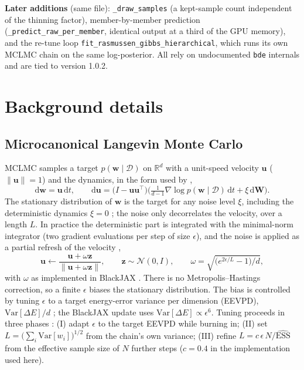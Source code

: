 \documentclass[11pt]{article}
\newcommand{\code}[1]{\texttt{#1}}
\begin{document}
\textbf{Later additions} (same file): \code{\_draw\_samples} (a kept-sample count independent of the thinning
factor), member-by-member prediction (\code{\_predict\_raw\_per\_member}, identical output at a third of the GPU
memory), and the re-tune loop \code{fit\_rasmussen\_gibbs\_hierarchical}, which runs its own MCLMC chain on the same
log-posterior. All rely on undocumented \code{bde} internals and are tied to version 1.0.2.

\par\endgroup
\section{Background details}
\label{app:bg}
\subsection{Microcanonical Langevin Monte Carlo}
\label{sec:mclmc}
MCLMC \citep{robnik2024mclmc} samples a target $p(\mathbf w\mid\mathcal{D})$ on $\mathbb{R}^d$ with a
unit-speed velocity $\mathbf{u}$ ($\lVert\mathbf{u}\rVert=1$) and the dynamics, in the form used by
\citet{sommer2025mile},
\begin{equation}
\label{eq:mclmc}
\mathrm{d}\mathbf w=\mathbf{u}\,\mathrm{d}t,\qquad
\mathrm{d}\mathbf{u}=\big(I-\mathbf{u}\mathbf{u}^\top\big)\Big(\tfrac{1}{d-1}\nabla\log p(\mathbf w\mid\mathcal{D})\,\mathrm{d}t
+\xi\,\mathrm{d}\mathbf{W}\Big).
\end{equation}
The stationary distribution of $\mathbf w$ is the target for any noise level $\xi$, including the
deterministic dynamics $\xi=0$ \citep{robnik2024mclmc}; the noise only decorrelates the velocity, over a
length $L$. In practice the deterministic part is integrated with the minimal-norm integrator (two gradient
evaluations per step of size $\epsilon$), and the noise is applied as a partial refresh of the velocity
\citep{robnik2024mclmc},
\begin{equation}
\mathbf{u}\leftarrow\frac{\mathbf{u}+\omega\mathbf{z}}{\lVert\mathbf{u}+\omega\mathbf{z}\rVert},\qquad
\mathbf{z}\sim\mathcal{N}(0,I),\qquad \omega=\sqrt{\big(e^{2\epsilon/L}-1\big)/d},
\end{equation}
with $\omega$ as implemented in BlackJAX \citep{cabezas2024blackjax}. There is no Metropolis--Hastings
correction, so a finite $\epsilon$ biases the stationary distribution. The bias is controlled by tuning
$\epsilon$ to a target energy-error variance per dimension (EEVPD), $\mathrm{Var}[\Delta E]/d$
\citep{robnik2023mchmc}; the BlackJAX update uses $\mathrm{Var}[\Delta E]\propto\epsilon^6$. Tuning
proceeds in three phases \citep{sommer2025mile}: (I) adapt $\epsilon$ to the target EEVPD while burning
in; (II) set $L=\big(\sum_i\mathrm{Var}[w_i]\big)^{1/2}$ from the chain's own variance; (III) refine
$L=c\,\epsilon\,N/\widehat{\mathrm{ESS}}$ from the effective sample size of $N$ further steps
($c=0.4$ in the implementation used here).
\end{document}
